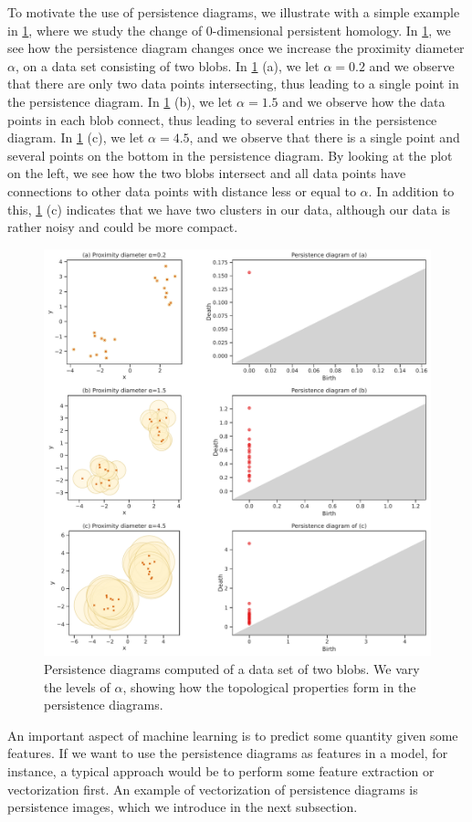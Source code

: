 To motivate the use of persistence diagrams, we illustrate with a simple example in \cref{fig:persistence-diagram-example}, where we study the change of 0-dimensional persistent homology. In \cref{fig:persistence-diagram-example}, we see how the persistence diagram changes once we increase the proximity diameter $\alpha$, on a data set consisting of two blobs. In \cref{fig:persistence-diagram-example} (a), we let $\alpha=0.2$ and we observe that there are only two data points intersecting, thus leading to a single point in the persistence diagram. In \cref{fig:persistence-diagram-example} (b), we let $\alpha=1.5$ and we observe how the data points in each blob connect, thus leading to several entries in the persistence diagram. In \cref{fig:persistence-diagram-example} (c), we let $\alpha=4.5$, and we observe that there is a single point and several points on the bottom in the persistence diagram. By looking at the plot on the left, we see how the two blobs intersect and all data points have connections to other data points with distance less or equal to $\alpha$. In addition to this, \cref{fig:persistence-diagram-example} (c) indicates that we have two clusters in our data, although our data is rather noisy and could be more compact.
\begin{figure}[H]
    \centering
    \includegraphics[width=\textwidth]{thesis/figures/persistence-diagram-example.pdf}
    \caption{Persistence diagrams computed of a data set of two blobs. We vary the levels of $\alpha$, showing how the topological properties form in the persistence diagrams.}
    \label{fig:persistence-diagram-example}
\end{figure}
An important aspect of machine learning is to predict some quantity given some features. If we want to use the persistence diagrams as features in a model, for instance, a typical approach would be to perform some feature extraction or vectorization first. An example of vectorization of persistence diagrams is persistence images, which we introduce in the next subsection.

